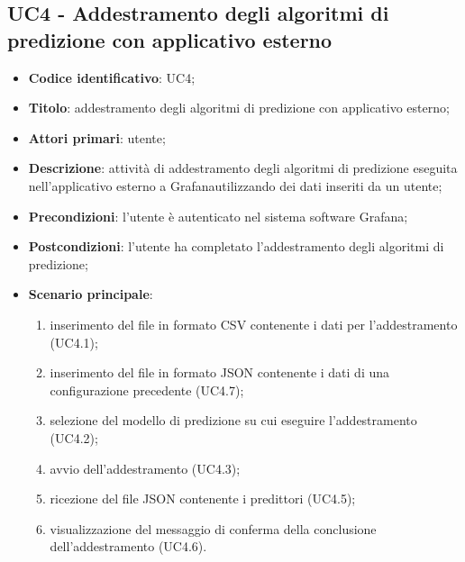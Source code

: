 \subsection{UC4 - Addestramento degli algoritmi di predizione con applicativo esterno}
\begin{itemize}
    \item \textbf{Codice identificativo}: UC4;
    \item \textbf{Titolo}: addestramento degli algoritmi di predizione con applicativo esterno;
    \item \textbf{Attori primari}: utente;
    \item \textbf{Descrizione}: attività di addestramento degli algoritmi di predizione eseguita nell'applicativo esterno a Grafana\glosp utilizzando dei dati inseriti da un utente;
    \item \textbf{Precondizioni}: l'utente è autenticato nel sistema software Grafana\glo;
    \item \textbf{Postcondizioni}: l'utente ha completato l'addestramento degli algoritmi di predizione;
    \item \textbf{Scenario principale}: 
        \begin{enumerate}
            \item inserimento del file in formato CSV contenente i dati per l'addestramento (UC4.1);
            \item inserimento del file in formato JSON contenente i dati di una configurazione precedente (UC4.7);
            \item selezione del modello di predizione su cui eseguire l'addestramento (UC4.2);
            \item avvio dell'addestramento (UC4.3);
            \item ricezione del file JSON contenente i predittori (UC4.5);
            \item visualizzazione del messaggio di conferma della conclusione dell'addestramento (UC4.6). 
        \end{enumerate}

\end{itemize}
